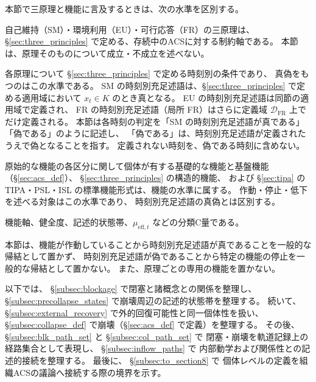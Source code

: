 \begin{remark}[本節における三原理と機能の記述水準]
\label{rem:s7_principle_levels}
本節で三原理と機能に言及するときは、次の水準を区別する。
\begin{description}[style=nextline]
  \item[原理]
  自己維持（SM）・環境利用（EU）・可行応答（FR）の三原理は、
  \S\ref{sec:three_principles} で定める、存続中のACSに対する制約軸である。
  本節は、原理そのものについて成立・不成立を述べない。
  \item[時刻別充足述語]
  各原理について \S\ref{sec:three_principles} で定める時刻別の条件であり、
  真偽をもつのはこの水準である。
  SM の時刻別充足述語は、\S\ref{sec:three_principles} で定める適用域において
  $x_t\in K$ のとき真となる。
  EU の時刻別充足述語は同節の適用域で定義され、
  FR の時刻別充足述語（局所 FR）はさらに定義域 $\mathcal{D}_{\mathrm{FR}}$ 上でだけ定義される。
  本節は各時刻の判定を「SM の時刻別充足述語が真である」「偽である」のように記述し、
  「偽である」は、時刻別充足述語が定義されたうえで偽となることを指す。
  定義されない時刻を、偽である時刻に含めない。
  \item[機能]
  原始的な機能の各区分に関して個体が有する基礎的な機能と基盤機能
  （\S\ref{sec:acs_def}）、
  \S\ref{sec:three_principles} の構造的機能、
  および \S\ref{sec:tipa} の TIPA・PSL・ISL の標準機能形式は、機能の水準に属する。
  作動・停止・低下を述べる対象はこの水準であり、
  時刻別充足述語の真偽とは区別する。
  \item[診断量]
  機能軸、健全度、記述的状態帯、$\mu_{\mathrm{eff},t}$ などの分類C量である。
\end{description}
本節は、機能が作動していることから時刻別充足述語が真であることを一般的な帰結として置かず、
時刻別充足述語が偽であることから特定の機能の停止を一般的な帰結として置かない。
また、原理ごとの専用の機能を置かない。
\end{remark}

以下では、
\S\ref{subsec:blockage} で閉塞と諸概念との関係を整理し、
\S\ref{subsec:precollapse_states} で崩壊周辺の記述的状態帯を整理する。
続いて、
\S\ref{subsec:external_recovery} で外的回復可能性と同一個体性を扱い、
\S\ref{subsec:collapse_def} で崩壊（\S\ref{sec:acs_def} で定義）を整理する。
その後、
\S\ref{subsec:blk_path_set} と
\S\ref{subsec:col_path_set} で
閉塞・崩壊を軌道記録上の経路集合として表現し、
\S\ref{subsec:inflow_paths} で
内部動学および関係性との記述的接続を整理する。
最後に、
\S\ref{subsec:to_section8} で
個体レベルの定義を組織ACSの議論へ接続する際の境界を示す。

